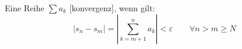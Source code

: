 Eine Reihe $\sum a_k$ [konvergenz], wenn gilt:
$$|s_n - s_m| = \left|\sum_{k=m+1}^{n} a_k\right| < \varepsilon \qquad \forall n > m \geq N$$